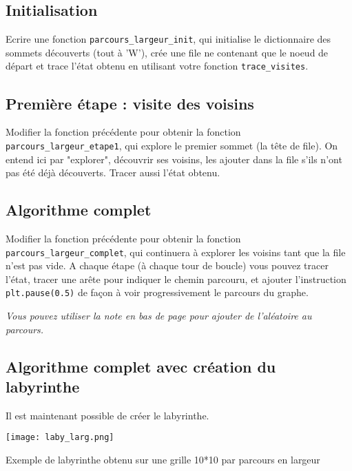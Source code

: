 \subsection*{Initialisation}
\begin{question}
Ecrire une fonction \lstinline{parcours_largeur_init}, qui initialise le dictionnaire des sommets découverts (tout à 'W'), crée une file ne contenant que le noeud de départ et trace l'état obtenu en utilisant votre fonction \lstinline{trace_visites}.
\end{question}


\subsection*{Première étape : visite des voisins}
\begin{question}
Modifier la fonction précédente pour obtenir la fonction \lstinline{parcours_largeur_etape1}, qui explore le premier sommet (la tête de file). On entend ici par "explorer", découvrir ses voisins, les ajouter dans la file s'ils n'ont pas été déjà découverts. Tracer aussi l'état obtenu. 
\end{question}

\subsection*{Algorithme complet}
\begin{question}
Modifier la fonction précédente pour obtenir la fonction \lstinline{parcours_largeur_complet}, qui continuera à explorer les voisins tant que la file n'est pas vide. A chaque étape (à chaque tour de boucle) vous pouvez tracer l'état, tracer une arête pour indiquer le chemin parcouru, et ajouter l'instruction \lstinline{plt.pause(0.5)} de façon à voir progressivement le parcours du graphe.
\end{question}

\textit{Vous pouvez utiliser la note en bas de page pour ajouter de l'aléatoire au parcours.}

\subsection*{Algorithme complet avec création du labyrinthe}
Il est maintenant possible de créer le labyrinthe.

\begin{marginfigure}\centering
\texttt{[image: laby\_larg.png]}
\caption{Exemple de labyrinthe obtenu sur une grille 10*10 par parcours en largeur}
\end{marginfigure}

